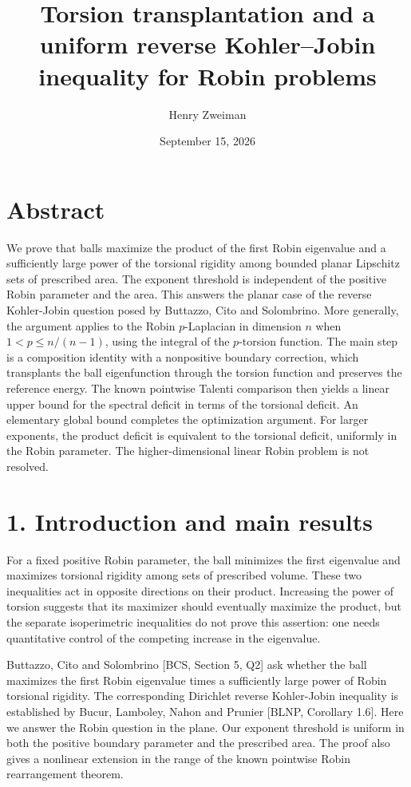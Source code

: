\documentclass[11pt]{article}
\title{Torsion transplantation and a uniform reverse Kohler--Jobin inequality for Robin problems}
\author{Henry Zweiman}
\date{September 15, 2026}
\begin{document}
\maketitle
\section{Abstract}\label{abstract}

We prove that balls maximize the product of the first Robin eigenvalue
and a sufficiently large power of the torsional rigidity among bounded
planar Lipschitz sets of prescribed area. The exponent threshold is
independent of the positive Robin parameter and the area. This answers
the planar case of the reverse Kohler-Jobin question posed by Buttazzo,
Cito and Solombrino. More generally, the argument applies to the Robin
\(p\)-Laplacian in dimension \(n\) when \(1<p\leq n/(n-1)\), using the
integral of the \(p\)-torsion function. The main step is a composition
identity with a nonpositive boundary correction, which transplants the
ball eigenfunction through the torsion function and preserves the
reference energy. The known pointwise Talenti comparison then yields a
linear upper bound for the spectral deficit in terms of the torsional
deficit. An elementary global bound completes the optimization argument.
For larger exponents, the product deficit is equivalent to the torsional
deficit, uniformly in the Robin parameter. The higher-dimensional linear
Robin problem is not resolved.

\section{1. Introduction and main
results}\label{introduction-and-main-results}

For a fixed positive Robin parameter, the ball minimizes the first
eigenvalue and maximizes torsional rigidity among sets of prescribed
volume. These two inequalities act in opposite directions on their
product. Increasing the power of torsion suggests that its maximizer
should eventually maximize the product, but the separate isoperimetric
inequalities do not prove this assertion: one needs quantitative control
of the competing increase in the eigenvalue.

Buttazzo, Cito and Solombrino {[}BCS, Section 5, Q2{]} ask whether the
ball maximizes the first Robin eigenvalue times a sufficiently large
power of Robin torsional rigidity. The corresponding Dirichlet reverse
Kohler-Jobin inequality is established by Bucur, Lamboley, Nahon and
Prunier {[}BLNP, Corollary 1.6{]}. Here we answer the Robin question in
the plane. Our exponent threshold is uniform in both the positive
boundary parameter and the prescribed area. The proof also gives a
nonlinear extension in the range of the known pointwise Robin
rearrangement theorem.
\end{document}
